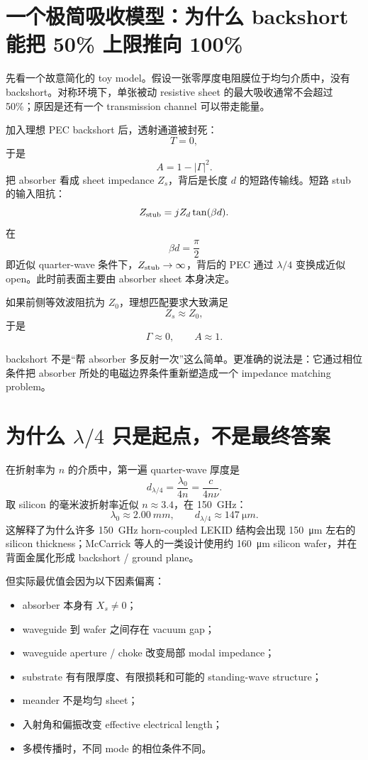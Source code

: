 \documentclass[11pt,a4paper,openany]{ctexrep}
\begin{document}
\section{一个极简吸收模型：为什么 backshort 能把 50\% 上限推向 100\%}

先看一个故意简化的 toy model。假设一张零厚度电阻膜位于均匀介质中，没有 backshort。对称环境下，单张被动 resistive sheet 的最大吸收通常不会超过 50\%；原因是还有一个 transmission channel 可以带走能量。

加入理想 PEC backshort 后，透射通道被封死：
\[
T=0,
\]
于是
\[
A=1-|\Gamma|^2.
\]
把 absorber 看成 sheet impedance $Z_s$，背后是长度 $d$ 的短路传输线。短路 stub 的输入阻抗：
\[
Z_{\rm stub}=jZ_d\tan(\beta d).
\]
在
\[
\beta d=\frac{\pi}{2}
\]
即近似 quarter-wave 条件下，$Z_{\rm stub}\rightarrow\infty$，背后的 PEC 通过 $\lambda/4$ 变换成近似 open。此时前表面主要由 absorber sheet 本身决定。

如果前侧等效波阻抗为 $Z_0$，理想匹配要求大致满足
\[
\boxed{Z_s\approx Z_0,}
\]
于是
\[
\Gamma\approx0,\qquad A\approx1.
\]

\begin{intuitionbox}
backshort 不是“帮 absorber 多反射一次”这么简单。更准确的说法是：它通过相位条件把 absorber 所处的电磁边界条件重新塑造成一个 impedance matching problem。
\end{intuitionbox}

\section{为什么 $\lambda/4$ 只是起点，不是最终答案}

在折射率为 $n$ 的介质中，第一遍 quarter-wave 厚度是
\[
d_{\lambda/4}=\frac{\lambda_0}{4n}=\frac{c}{4n\nu}.
\]
取 silicon 的毫米波折射率近似 $n\approx3.4$，在 \SI{150}{GHz}：
\[
\lambda_0\approx\SI{2.00}{mm},
\qquad
d_{\lambda/4}\approx\SI{147}{\micro m}.
\]
这解释了为什么许多 \SI{150}{GHz} horn-coupled LEKID 结构会出现 \SI{150}{\micro m} 左右的 silicon thickness；McCarrick 等人的一类设计使用约 \SI{160}{\micro m} silicon wafer，并在背面金属化形成 backshort / ground plane。

但实际最优值会因为以下因素偏离：
\begin{itemize}
  \item absorber 本身有 $X_s\neq0$；
  \item waveguide 到 wafer 之间存在 vacuum gap；
  \item waveguide aperture / choke 改变局部 modal impedance；
  \item substrate 有有限厚度、有限损耗和可能的 standing-wave structure；
  \item meander 不是均匀 sheet；
  \item 入射角和偏振改变 effective electrical length；
  \item 多模传播时，不同 mode 的相位条件不同。
\end{itemize}
\end{document}

